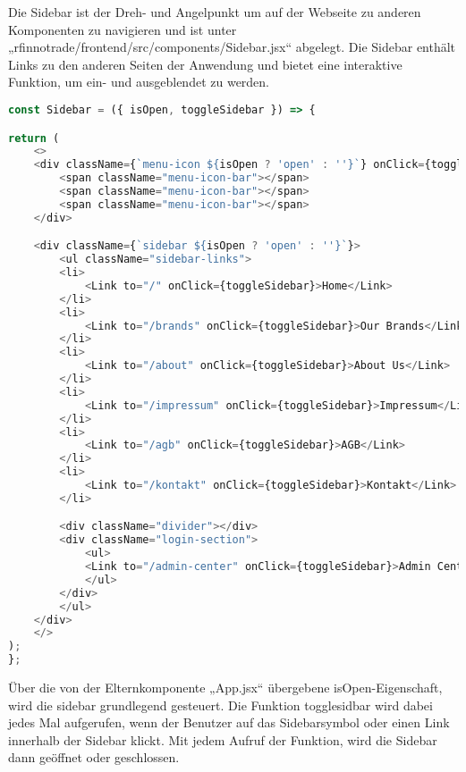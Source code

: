 Die Sidebar ist der Dreh- und Angelpunkt um auf der Webseite zu anderen Komponenten zu navigieren und ist unter „rfinnotrade/frontend/src/components/Sidebar.jsx“ abgelegt.
Die Sidebar enthält Links zu den anderen Seiten der Anwendung und bietet eine interaktive Funktion, um ein- und ausgeblendet zu werden.

\begin{lstlisting}[language=JavaScript, caption={Sidebar.jsx}, label={lst:sidebarjsx}]
const Sidebar = ({ isOpen, toggleSidebar }) => {

return (
    <>
    <div className={`menu-icon ${isOpen ? 'open' : ''}`} onClick={toggleSidebar}>
        <span className="menu-icon-bar"></span>
        <span className="menu-icon-bar"></span>
        <span className="menu-icon-bar"></span>
    </div>

    <div className={`sidebar ${isOpen ? 'open' : ''}`}>
        <ul className="sidebar-links">
        <li>
            <Link to="/" onClick={toggleSidebar}>Home</Link>
        </li>
        <li>
            <Link to="/brands" onClick={toggleSidebar}>Our Brands</Link>
        </li>
        <li>
            <Link to="/about" onClick={toggleSidebar}>About Us</Link>
        </li>
        <li>
            <Link to="/impressum" onClick={toggleSidebar}>Impressum</Link>
        </li>
        <li>
            <Link to="/agb" onClick={toggleSidebar}>AGB</Link>
        </li>  
        <li>
            <Link to="/kontakt" onClick={toggleSidebar}>Kontakt</Link>
        </li>

        <div className="divider"></div>
        <div className="login-section">
            <ul>
            <Link to="/admin-center" onClick={toggleSidebar}>Admin Center</Link>
            </ul>
        </div>
        </ul>
    </div>
    </>
);
};
\end{lstlisting}

Über die von der Elternkomponente „App.jsx“ übergebene isOpen-Eigenschaft, wird die sidebar grundlegend gesteuert. Die Funktion togglesidbar wird dabei jedes Mal aufgerufen, wenn der Benutzer auf das Sidebarsymbol oder einen Link innerhalb der Sidebar klickt. Mit jedem Aufruf der Funktion, wird die Sidebar dann geöffnet oder geschlossen.